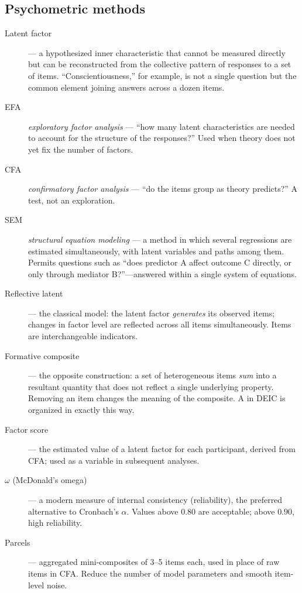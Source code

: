 \subsection*{Psychometric methods}

\begin{description}
    \item[Latent factor] --- a hypothesized inner characteristic that cannot be measured directly but can be reconstructed from the collective pattern of responses to a set of items. ``Conscientiousness,'' for example, is not a single question but the common element joining answers across a dozen items.
    \item[EFA] \textit{exploratory factor analysis} --- ``how many latent characteristics are needed to account for the structure of the responses?'' Used when theory does not yet fix the number of factors.
    \item[CFA] \textit{confirmatory factor analysis} --- ``do the items group as theory predicts?'' A test, not an exploration.
    \item[SEM] \textit{structural equation modeling} --- a method in which several regressions are estimated simultaneously, with latent variables and paths among them. Permits questions such as ``does predictor A affect outcome C directly, or only through mediator B?''---answered within a single system of equations.
    \item[Reflective latent] --- the classical model: the latent factor \emph{generates} its observed items; changes in factor level are reflected across all items simultaneously. Items are interchangeable indicators.
    \item[Formative composite] --- the opposite construction: a set of heterogeneous items \emph{sum} into a resultant quantity that does not reflect a single underlying property. Removing an item changes the meaning of the composite. A in DEIC is organized in exactly this way.
    \item[Factor score] --- the estimated value of a latent factor for each participant, derived from CFA; used as a variable in subsequent analyses.
    \item[$\omega$ (McDonald's omega)] --- a modern measure of internal consistency (reliability), the preferred alternative to Cronbach's $\alpha$. Values above $0.80$ are acceptable; above $0.90$, high reliability.
    \item[Parcels] --- aggregated mini-composites of 3--5 items each, used in place of raw items in CFA. Reduce the number of model parameters and smooth item-level noise.

\end{description}
